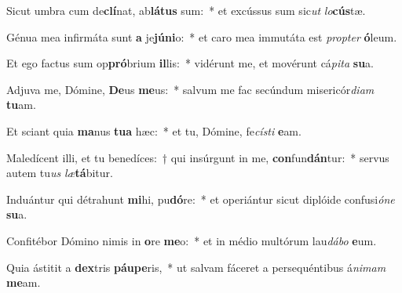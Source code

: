 \item Sicut umbra cum de\textbf{clí}nat, ab\textbf{lá}\textbf{tus} sum:~* et excússus sum sic\textit{ut} \textit{lo}\textbf{cús}tæ.
\item Génua mea infirmáta sunt \textbf{a} je\textbf{jú}\textbf{ni}o:~* et caro mea immutáta est \textit{prop}\textit{ter} \textbf{ó}leum.
\item Et ego factus sum op\textbf{pró}brium \textbf{il}lis:~* vidérunt me, et movérunt cá\textit{pi}\textit{ta} \textbf{su}a.
\item Adjuva me, Dómine, \textbf{De}us \textbf{me}us:~* salvum me fac secúndum misericór\textit{di}\textit{am} \textbf{tu}am.
\item Et sciant quia \textbf{ma}nus \textbf{tu}\textbf{a} hæc:~* et tu, Dómine, fe\textit{cís}\textit{ti} \textbf{e}am.
\item Maledícent illi, et tu benedíces:~† qui insúrgunt in me, \textbf{con}fun\textbf{dán}tur:~* servus autem tu\textit{us} \textit{læ}\textbf{tá}bitur.
\item Induántur qui détrahunt \textbf{mi}hi, pu\textbf{dó}re:~* et operiántur sicut diplóide confusi\textit{ó}\textit{ne} \textbf{su}a.
\item Confitébor Dómino nimis in \textbf{o}re \textbf{me}o:~* et in médio multórum lau\textit{dá}\textit{bo} \textbf{e}um.
\item Quia ástitit a \textbf{dex}tris \textbf{páu}\textbf{pe}ris,~* ut salvam fáceret a persequéntibus á\textit{ni}\textit{mam} \textbf{me}am.
